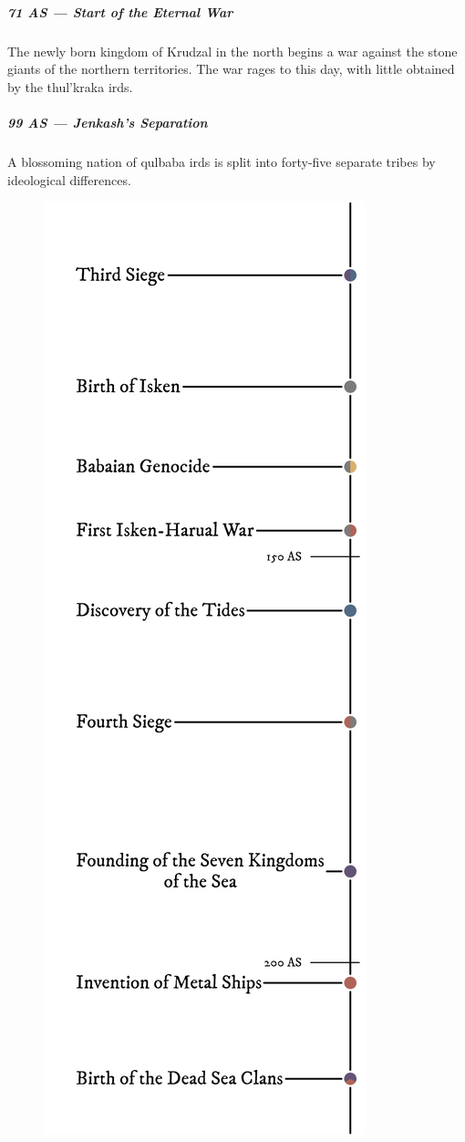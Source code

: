 \begin{linenumbers}
\subparagraph{71 AS --- Start of the Eternal War} The newly born kingdom of Krudzal in the north begins a war against the stone giants of the northern territories.
The war rages to this day, with little obtained by the thul'kraka irds.

\subparagraph{99 AS --- Jenkash's Separation} A blossoming nation of qulbaba irds is split into forty-five separate tribes by ideological differences.

\begin{figure}[H]
    \centering \includegraphics{01intro/img/30history_iii.png}
\end{figure}


\end{linenumbers}
